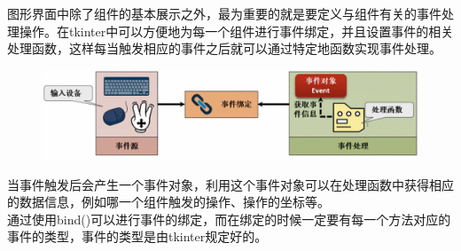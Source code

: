 图形界面中除了组件的基本展示之外，最为重要的就是要定义与组件有关的事件处理操作。在tkinter中可以方便地为每一个组件进行事件绑定，并且设置事件的相关处理函数，这样每当触发相应的事件之后就可以通过特定地函数实现事件处理。

\begin{figure}[H]
	\centering
	\includegraphics[]{img/C13/13-2/1.png}
\end{figure}

当事件触发后会产生一个事件对象，利用这个事件对象可以在处理函数中获得相应的数据信息，例如哪一个组件触发的操作、操作的坐标等。\\

通过使用bind()可以进行事件的绑定，而在绑定的时候一定要有每一个方法对应的事件的类型，事件的类型是由tkinter规定好的。

\begin{table}[H]
	\centering
	\caption{事件}
\end{table}

